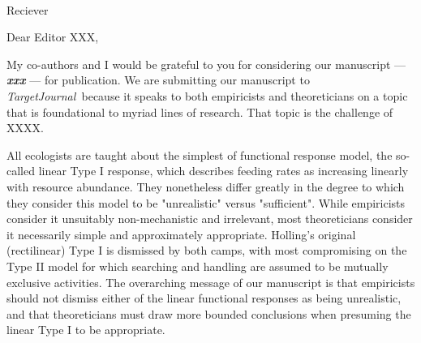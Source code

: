 \documentclass[10pt, a4paper]{letter} %
\newcommand{\TJ}{\textit{TargetJournal~}}
\begin{document}

\begin{letter}{
	\\Reciever
}



\opening{Dear Editor XXX,}


My co-authors and I would be grateful to you for considering our manuscript 
--- 
\textbf{\textit{
		xxx
}}
---
for publication.
We are submitting our manuscript to \TJ because 
it speaks to both empiricists and theoreticians on a topic that is foundational to myriad lines of research.
That topic is the challenge of XXXX.

All ecologists are taught about the simplest of functional response model, 
the so-called linear Type I response,
which describes feeding rates as increasing linearly with resource abundance.  
They nonetheless differ greatly in the degree to which they consider this model 
to be "unrealistic" versus "sufficient".
While empiricists consider it unsuitably non-mechanistic and irrelevant,
most theoreticians consider it necessarily simple and approximately 
appropriate. 
Holling's original (rectilinear) Type I is dismissed by both camps, 
with most compromising on the Type II model for which searching and handling are assumed to be mutually exclusive activities. 
The overarching message of our manuscript is that empiricists should not dismiss 
either of the linear functional responses as being unrealistic, 
and that theoreticians must draw more bounded conclusions when presuming the linear Type I to be appropriate.


\end{letter}
\end{document}
